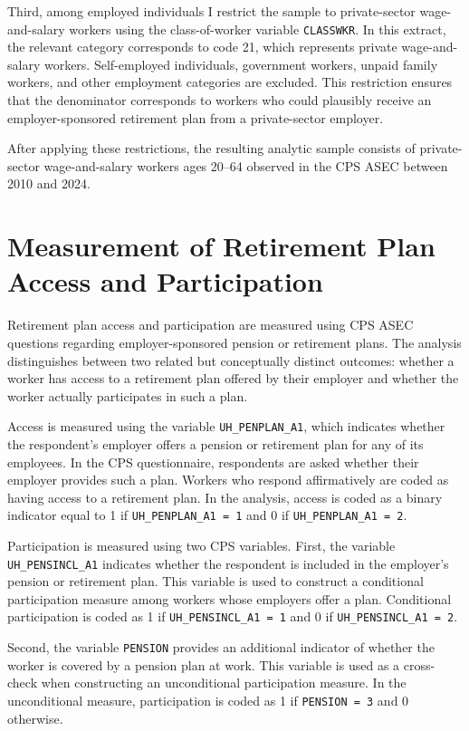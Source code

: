 \documentclass[11pt]{article}
\begin{document}
Third, among employed individuals I restrict the sample to private-sector wage-and-salary workers using the class-of-worker variable \texttt{CLASSWKR}. In this extract, the relevant category corresponds to code 21, which represents private wage-and-salary workers. Self-employed individuals, government workers, unpaid family workers, and other employment categories are excluded. This restriction ensures that the denominator corresponds to workers who could plausibly receive an employer-sponsored retirement plan from a private-sector employer.

After applying these restrictions, the resulting analytic sample consists of private-sector wage-and-salary workers ages 20--64 observed in the CPS ASEC between 2010 and 2024.

\section{Measurement of Retirement Plan Access and Participation}

Retirement plan access and participation are measured using CPS ASEC questions regarding employer-sponsored pension or retirement plans. The analysis distinguishes between two related but conceptually distinct outcomes: whether a worker has access to a retirement plan offered by their employer and whether the worker actually participates in such a plan.

Access is measured using the variable \texttt{UH\_PENPLAN\_A1}, which indicates whether the respondent's employer offers a pension or retirement plan for any of its employees. In the CPS questionnaire, respondents are asked whether their employer provides such a plan. Workers who respond affirmatively are coded as having access to a retirement plan. In the analysis, access is coded as a binary indicator equal to 1 if \texttt{UH\_PENPLAN\_A1 = 1} and 0 if \texttt{UH\_PENPLAN\_A1 = 2}.

Participation is measured using two CPS variables. First, the variable \texttt{UH\_PENSINCL\_A1} indicates whether the respondent is included in the employer's pension or retirement plan. This variable is used to construct a conditional participation measure among workers whose employers offer a plan. Conditional participation is coded as 1 if \texttt{UH\_PENSINCL\_A1 = 1} and 0 if \texttt{UH\_PENSINCL\_A1 = 2}.

Second, the variable \texttt{PENSION} provides an additional indicator of whether the worker is covered by a pension plan at work. This variable is used as a cross-check when constructing an unconditional participation measure. In the unconditional measure, participation is coded as 1 if \texttt{PENSION = 3} and 0 otherwise.
\end{document}
